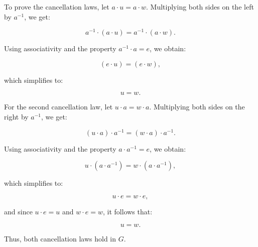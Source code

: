 To prove the cancellation laws, let \( a \cdot u = a \cdot w \). Multiplying both sides on the left by \( a^{-1} \), we get:

\[a^{-1} \cdot (a \cdot u) = a^{-1} \cdot (a \cdot w).
\]

Using associativity and the property \( a^{-1} \cdot a = e \), we obtain:

\[
(e \cdot u) = (e \cdot w),
\]

which simplifies to:

\[
u = w.
\]

For the second cancellation law, let \( u \cdot a = w \cdot a \). Multiplying both sides on the right by \( a^{-1} \), we get:

\[
(u \cdot a) \cdot a^{-1} = (w \cdot a) \cdot a^{-1}.
\]

Using associativity and the property \( a \cdot a^{-1} = e \), we obtain:

\[
u \cdot (a \cdot a^{-1}) = w \cdot (a \cdot a^{-1}),
\]

which simplifies to:

\[
u \cdot e = w \cdot e,
\]

and since \( u \cdot e = u \) and \( w \cdot e = w \), it follows that:

\[
u = w.
\]

Thus, both cancellation laws hold in \( G \).


